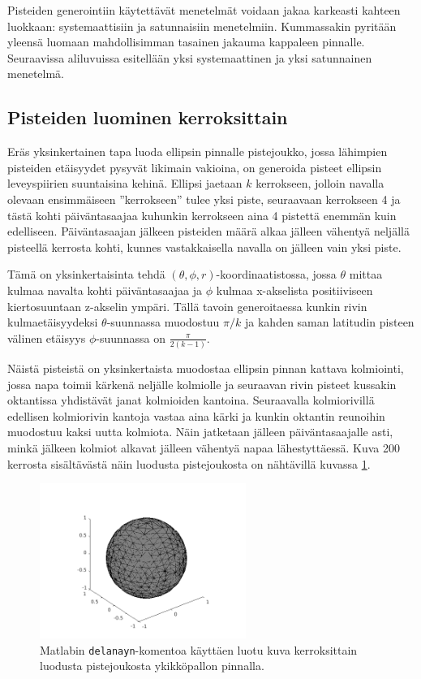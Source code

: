 \documentclass[12pt,a4paper,titlepage]{article}
\begin{document}
Pisteiden generointiin käytettävät menetelmät voidaan jakaa karkeasti kahteen luokkaan: systemaattisiin ja satunnaisiin menetelmiin. Kummassakin pyritään yleensä luomaan mahdollisimman tasainen jakauma kappaleen pinnalle. Seuraavissa aliluvuissa esitellään yksi systemaattinen ja yksi satunnainen menetelmä.

\subsection{Pisteiden luominen kerroksittain}
Eräs yksinkertainen tapa luoda ellipsin pinnalle pistejoukko, jossa lähimpien pisteiden etäisyydet pysyvät likimain vakioina, on generoida pisteet ellipsin leveyspiirien suuntaisina kehinä. Ellipsi jaetaan $k$ kerrokseen, jolloin navalla olevaan ensimmäiseen ''kerrokseen'' tulee yksi piste, seuraavaan kerrokseen 4 ja tästä kohti päiväntasaajaa kuhunkin kerrokseen aina 4 pistettä enemmän kuin edelliseen. Päiväntasaajan jälkeen pisteiden määrä alkaa jälleen vähentyä neljällä pisteellä kerrosta kohti, kunnes vastakkaisella navalla on jälleen vain yksi piste.

Tämä on yksinkertaisinta tehdä $(\theta, \phi, r)$-koordinaatistossa, jossa $\theta$ mittaa kulmaa navalta kohti päiväntasaajaa ja $\phi$ kulmaa x-akselista positiiviseen kiertosuuntaan z-akselin ympäri. Tällä tavoin generoitaessa kunkin rivin kulmaetäisyydeksi $\theta$-suunnassa muodostuu $\pi/k$ ja kahden saman latitudin pisteen välinen etäisyys $\phi$-suunnassa on $\frac{\pi}{2(k-1)}$.

Näistä pisteistä on yksinkertaista muodostaa ellipsin pinnan kattava kolmiointi, jossa napa toimii kärkenä neljälle kolmiolle ja seuraavan rivin pisteet kussakin oktantissa yhdistävät janat kolmioiden kantoina. Seuraavalla kolmiorivillä edellisen kolmiorivin kantoja vastaa aina kärki ja kunkin oktantin reunoihin muodostuu kaksi uutta kolmiota. Näin jatketaan jälleen päiväntasaajalle asti, minkä jälkeen kolmiot alkavat jälleen vähentyä napaa lähestyttäessä. Kuva 200 kerrosta sisältävästä näin luodusta pistejoukosta on nähtävillä kuvassa \ref{murrikolmiointi}.

\begin{figure}
  \centering
  \includegraphics[width=0.6\textwidth]{../Delaunay/data/murrikolmiot/pallo.png}
  \caption{Matlabin \texttt{delanayn}-komentoa käyttäen luotu kuva kerroksittain luodusta pistejoukosta ykikköpallon pinnalla.}
  \label{murrikolmiointi}
\end{figure}
\end{document}
